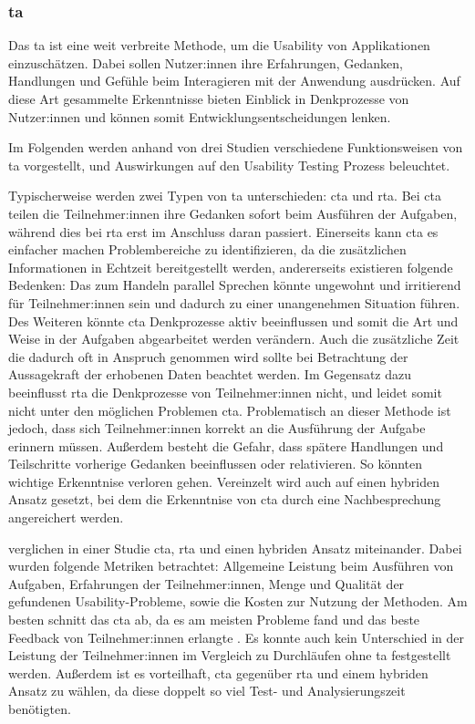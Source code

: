 \parencite{barnumUsabilityTesting2021}

\subsubsection{\acl{ta}}
Das \ac{ta} ist eine weit verbreite Methode, um die Usability von Applikationen einzuschätzen. Dabei
sollen Nutzer:innen ihre Erfahrungen, Gedanken, Handlungen und Gefühle beim Interagieren mit der
Anwendung ausdrücken. Auf diese Art gesammelte Erkenntnisse  bieten Einblick in
Denkprozesse von Nutzer:innen und können somit Entwicklungsentscheidungen lenken.
\parencite{alhadretiRethinkingThinking2018}

Im Folgenden werden anhand von drei Studien verschiedene Funktionsweisen von \ac{ta} vorgestellt,
und Auswirkungen auf den Usability Testing Prozess beleuchtet.

Typischerweise werden zwei Typen von \ac{ta} unterschieden: \ac{cta} und \ac{rta}. Bei \ac{cta}
teilen die Teilnehmer:innen ihre Gedanken sofort beim Ausführen der Aufgaben, während dies bei
\ac{rta} erst im Anschluss daran passiert. Einerseits kann \ac{cta} es einfacher machen
Problembereiche zu identifizieren, da die zusätzlichen Informationen in Echtzeit bereitgestellt
werden, andererseits existieren folgende Bedenken: Das zum Handeln parallel Sprechen könnte
ungewohnt und irritierend für Teilnehmer:innen sein und dadurch zu einer unangenehmen Situation
führen. Des Weiteren könnte \ac{cta} Denkprozesse aktiv beeinflussen und somit die Art und Weise in
der Aufgaben abgearbeitet werden verändern. Auch die zusätzliche Zeit die dadurch oft in Anspruch
genommen wird sollte bei Betrachtung der Aussagekraft der erhobenen Daten beachtet werden.  Im Gegensatz dazu beeinflusst \ac{rta} die Denkprozesse von Teilnehmer:innen nicht, und
leidet somit nicht unter den möglichen Problemen \ac{cta}. Problematisch an dieser Methode ist
jedoch, dass sich Teilnehmer:innen korrekt an die Ausführung der Aufgabe erinnern müssen. Außerdem
besteht die Gefahr, dass spätere Handlungen und Teilschritte vorherige Gedanken beeinflussen oder
relativieren. So könnten wichtige Erkenntnise verloren gehen. Vereinzelt wird auch auf einen
hybriden Ansatz gesetzt, bei dem die Erkenntnise von \ac{cta} durch eine Nachbesprechung
angereichert werden. \cite{alhadretiRethinkingThinking2018}

\textcite{alhadretiRethinkingThinking2018} verglichen in einer Studie \ac{cta}, \ac{rta} und einen
hybriden Ansatz miteinander. Dabei wurden folgende Metriken betrachtet: Allgemeine Leistung beim
Ausführen von Aufgaben, Erfahrungen der Teilnehmer:innen, Menge und Qualität der gefundenen
Usability-Probleme, sowie die Kosten zur Nutzung der Methoden. Am besten schnitt das \acl{cta} ab,
da es am meisten Probleme fand und das beste Feedback von Teilnehmer:innen erlangte
. Es konnte auch kein Unterschied in der Leistung der Teilnehmer:innen im Vergleich
zu Durchläufen ohne \ac{ta} festgestellt werden. Außerdem ist es vorteilhaft, \ac{cta} gegenüber
\ac{rta} und einem hybriden Ansatz zu wählen, da diese doppelt so viel Test- und Analysierungszeit
benötigten.
\parencite{alhadretiRethinkingThinking2018}

